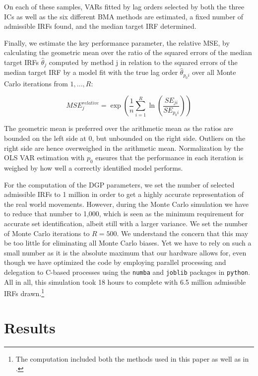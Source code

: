 \documentclass[12pt, a4paper]{article}
\begin{document}
On each of these samples, VARs fitted by lag orders selected by both the three ICs as well as the six different BMA methods are estimated, a fixed number of admissible IRFs found, and the median target IRF determined. 

Finally, we estimate the key performance parameter, the relative MSE, by calculating the geometric mean over the ratio of the squared errors of the median target IRFs $\hat \theta_j$ computed by method j in relation to the squared errors of the median target IRF by a model fit with the true lag order $\hat \theta_{p_0i}$ over all Monte Carlo iterations from $1, ..., R$:

\begin{equation}
    MSE^{relative}_j = \exp\left( \frac{1}{n} \sum_{i=1}^{R} \ln(\frac{SE_{ji}}{SE_{p_0i}}) \right)
\end{equation}

The geometric mean is preferred over the arithmetic mean as the ratios are bounded on the left side at 0, but unbounded on the right side. Outliers on the right side are hence overweighed in the arithmetic mean. Normalization by the OLS VAR estimation with $p_0$ ensures that the performance in each iteration is weighed by how well a correctly identified model performs.

For the computation of the DGP parameters, we set the number of selected admissible IRFs to 1 million in order to get a highly accurate representation of the real world movements. However, during the Monte Carlo simulation we have to reduce that number to 1,000, which is seen as the minimum requirement for accurate set identification, albeit still with a larger variance. We set the number of Monte Carlo iterations to $R=500$. We understand the concern that this may be too little for eliminating all Monte Carlo biases. Yet we have to rely on such a small number as it is the absolute maximum that our hardware allows for, even though we have optimized the code by employing parallel processing and delegation to C-based processes using the \texttt{numba} and \texttt{joblib} packages in \texttt{python}. All in all, this simulation took 18 hours to complete with 6.5 million admissible IRFs drawn.\footnote{The computation included both the methods used in this paper as well as in \citet{AydinBVAR2026}.}

\section{Results}
\label{sec:results}
\end{document}
